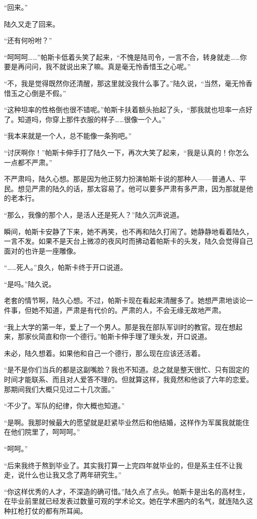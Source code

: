 “回来。”

陆久又走了回来。

“还有何吩咐？”

“呵呵呵……”帕斯卡低着头笑了起来，“不愧是陆司令，一言不合，转身就走……你要是再问问，我不就说出来了嘛。真是毫无怜香惜玉之心呢。”

“不，我是觉得既然你还清醒，那这里就没我什么事了。”陆久说，“当然，毫无怜香惜玉之心倒是不假。”

“这种坦率的性格倒也很不错呢。”帕斯卡扶着额头抬起了头，“那我就也坦率一点好了。知道吗，你穿上那件衣服的样子……很像一个人。”

“我本来就是一个人，总不能像一条狗吧。”

“讨厌啊你！”帕斯卡伸手打了陆久一下，再次大笑了起来，“我是认真的！你怎么一点都不严肃。”

不严肃吗，陆久心想。那是因为他正努力扮演帕斯卡说的那种人——普通人、平民。想见严肃的陆久的话，那太容易了。他可以要多严肃有多严肃，因为那就是他的老本行。

“那么，我像的那个人，是活人还是死人？”陆久沉声说道。

瞬间，帕斯卡安静了下来，她不再笑，也不再和陆久打闹了。她静静地看着陆久，一言不发。如果不是天台上微凉的夜风时而拂动着帕斯卡的头发，陆久会觉得自己面对的也许是一座雕像。

“……死人。”良久，帕斯卡终于开口说道。

“是吗。”陆久说。

老套的情节啊，陆久心想。不过，帕斯卡现在看起来清醒多了。她想严肃地谈论一件事，但她不知道，严肃是有代价的。严肃的人，不会无缘无故地严肃。

“我上大学的第一年，爱上了一个男人。那是我在部队军训时的教官。现在想起来，那家伙简直和你一个德行。”帕斯卡伸手理了理头发，开口说道。

未必，陆久想着。如果他和自己一个德行，那么现在应该还活着。

“是不是你们当兵的都是这副嘴脸？我也不知道。总之就是整天很忙、只有固定的时间才能联系、而且对人爱答不理的。但就算这样，我竟然和他谈了六年的恋爱。那期间我们大概只见过二十几次面。”

“不少了。军队的纪律，你大概也知道。”

“是啊。我那时候最大的愿望就是赶紧毕业然后和他结婚，这样作为军属我就能住在他们院里了，呵呵呵。”

“呵呵。”

“后来我终于熬到毕业了。其实我打算一上完四年就毕业的，但是系主任不让我走，说什么也让我又念了两年研究生。”

“你这样优秀的人才，不深造的确可惜。”陆久点了点头。帕斯卡是出名的高材生，在毕业前里就已经发表过数量可观的学术论文。她在学术圈内的名气，就连陆久这种扛枪打仗的都有所耳闻。

